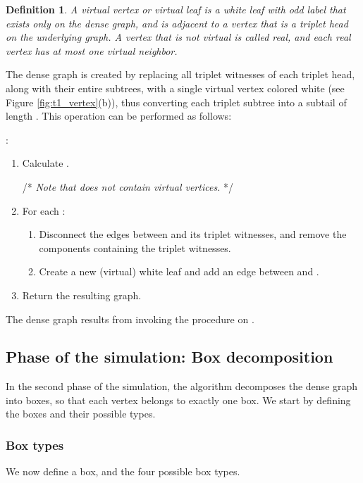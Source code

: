 \documentclass[11pt]{article}
\def\dnsitem{\vspace{-7pt}\item}
\def\dnssubitem{\vspace{-5pt}\item}
\newtheorem{definition}[theorem]{Definition}
\theoremstyle{definition}
\def\densify{\mbox{\sf Densify}}
\begin{document}
\begin{definition}
A \emph{virtual vertex} or \emph{virtual leaf} is a white leaf with odd label  that exists only on the dense graph, and is adjacent to a vertex  that is a triplet head on the underlying graph.
A vertex that is not virtual is called \emph{real}, and each real vertex has at most one virtual neighbor.
\end{definition}

The dense graph is created by replacing all triplet witnesses of each triplet head, along with their entire subtrees, 
with a single virtual vertex colored white (see Figure \ref{fig:t1_vertex}(b)), thus converting each triplet subtree into a subtail of length .
This operation can be performed as follows:
\smallskip
\par\noindent{\bf Procedure \densify}:
\begin{enumerate}
	\dnsitem
	Calculate .
	
	/* \textit{Note that  does not contain virtual vertices.} */ 
	\dnsitem For each :
	\begin{enumerate}
		\dnsitem Disconnect the edges between  and its triplet witnesses, and remove the components containing the triplet witnesses.
		\dnssubitem Create a new (virtual) white leaf  and add an edge between  and .
	\end{enumerate}
	\dnsitem Return the resulting graph.
\end{enumerate}
The dense graph  results from invoking the procedure  on .


\subsection{Phase  of the simulation: Box decomposition}
\label{sub:alg_decomp}

In the second phase of the simulation, the algorithm decomposes the dense graph  into boxes, so that each vertex belongs to exactly one box.
We start by defining the boxes and their possible types.

\subsubsection{Box types}
\label{sub:box_types}

We now define a box, and the four possible box types.
\end{document}
